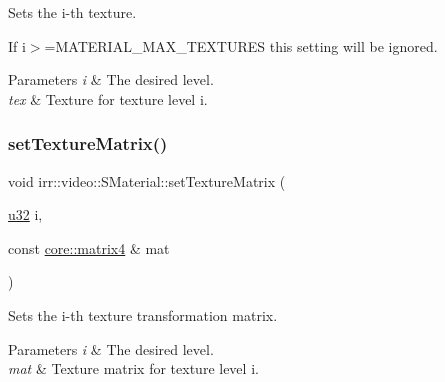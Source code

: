 Sets the i-\/th texture. 

If i$>$=M\+A\+T\+E\+R\+I\+A\+L\+\_\+\+M\+A\+X\+\_\+\+T\+E\+X\+T\+U\+R\+ES this setting will be ignored. 
\begin{DoxyParams}{Parameters}
{\em i} & The desired level. \\
\hline
{\em tex} & Texture for texture level i. \\
\hline
\end{DoxyParams}
\mbox{\label{classirr_1_1video_1_1SMaterial_a6e1a89f5005226a9cecb5272ef44ba7d}} 
\subsubsection{\texorpdfstring{set\+Texture\+Matrix()}{setTextureMatrix()}\hspace{0.1cm}{\footnotesize\ttfamily [1/2]}}
{\footnotesize\ttfamily void irr\+::video\+::\+S\+Material\+::set\+Texture\+Matrix (\begin{DoxyParamCaption}\item[{\hyperlink{namespaceirr_a0416a53257075833e7002efd0a18e804}{u32}}]{i,  }\item[{const \hyperlink{namespaceirr_1_1core_a4c9d4e29899535971052810954a14431}{core\+::matrix4} \&}]{mat }\end{DoxyParamCaption})\hspace{0.3cm}{\ttfamily [inline]}}



Sets the i-\/th texture transformation matrix. 


\begin{DoxyParams}{Parameters}
{\em i} & The desired level. \\
\hline
{\em mat} & Texture matrix for texture level i. \\
\hline
\end{DoxyParams}
\mbox{\label{classirr_1_1video_1_1SMaterial_a6e1a89f5005226a9cecb5272ef44ba7d}} 
